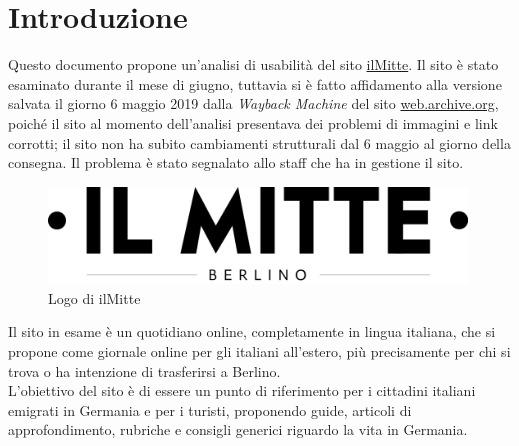\newpage
\section{Introduzione}
Questo documento propone un'analisi di usabilità del sito \href{https://ilmitte.com}{ilMitte}. Il sito è stato esaminato durante il mese di giugno, tuttavia si è fatto affidamento alla versione salvata il giorno 6 maggio 2019 dalla \textit{Wayback Machine} del sito \href{https://web.archive.org/web/}{web.archive.org}, poiché il sito al momento dell'analisi presentava dei problemi di immagini e link corrotti; il sito non ha subito cambiamenti strutturali dal 6 maggio al giorno della consegna. Il problema è stato segnalato allo staff che ha in gestione il sito.

\vspace{40pt}
\begin{figure}[htbp]
\begin{center}
\includegraphics[width=30em]{img/logo}
\caption{Logo di ilMitte}
\end{center}
\end{figure}
\vspace{30pt}

Il sito in esame è un quotidiano online, completamente in lingua italiana, che si propone come giornale online per gli italiani all'estero, più precisamente per chi si trova o ha intenzione di trasferirsi a Berlino.\\
L'obiettivo del sito è di essere un punto di riferimento per i cittadini italiani emigrati in Germania e per i turisti, proponendo guide, articoli di approfondimento, rubriche e consigli generici riguardo la vita in Germania.